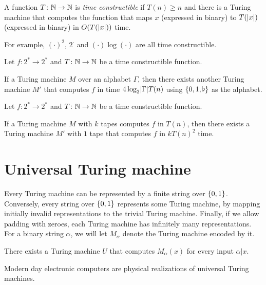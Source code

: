 \begin{definition} \label{def:tcf}
    A function $T\colon \mathbb{N} \to \mathbb{N}$ is \emph{time constructible} if
    $T(n) \ge n$ and there is a Turing machine that computes the function
    that maps $x$ (expressed in binary) to $T(\lvert x\rvert)$
    (expressed in binary) in $O(T(\lvert x\rvert))$ time.
\end{definition}
For example, $(\cdot)^2$, $2^\cdot$ and $(\cdot) \log (\cdot)$ are all
time constructible.

\begin{theorem} \label{thm:binary}
    Let $f\colon 2^* \to 2^*$ and $T\colon \mathbb{N} \to \mathbb{N}$ be a time
    constructible function.

    If a Turing machine $M$ over an alphabet $\Gamma$, then
    there exists another Turing machine $M'$ that computes $f$ in time
    $4 \log_2 \lvert\Gamma\rvert T(n)$ using $\{0, 1, \flat\}$ as the alphabet.
\end{theorem}

\begin{theorem} \label{thm:one-tape}
    Let $f\colon 2^* \to 2^*$ and $T\colon \mathbb{N} \to \mathbb{N}$ be a time
    constructible function.

    If a Turing machine $M$ with $k$ tapes computes $f$ in $T(n)$, then
    there exists a Turing machine $M'$ with $1$ tape that computes $f$ in
    $k T(n)^2$ time.
\end{theorem}

\section{Universal Turing machine}
Every Turing machine can be represented by a finite string over
$\{0, 1\}$.
Conversely, every string over $\{0, 1\}$ represents some Turing machine,
by mapping initially invalid representations to the trivial Turing machine.
Finally, if we allow padding with zeroes, each Turing machine has infinitely
many representations.
For a binary string $\alpha$, we will let $M_\alpha$ denote the Turing
machine encoded by it.

\begin{theorem} \label{thm:utm}
    There exists a Turing machine $U$ that computes $M_\alpha(x)$ for
    every input $\alpha\vert x$.
\end{theorem}
Modern day electronic computers are physical realizations of universal
Turing machines.
